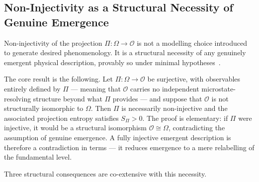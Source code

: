 \subsection{Non-Injectivity as a Structural Necessity of Genuine Emergence}
  \label{subsec:non-injectivity-not-ad-hoc}

  Non-injectivity of the projection $\Pi : \Omega \to \mathcal{O}$ is not a modelling
  choice introduced to generate desired phenomenology.
  It is a structural necessity of any genuinely emergent physical description, provably
  so under minimal hypotheses~\cite{Beau2026l}.

  The core result is the following.
  Let $\Pi : \Omega \to \mathcal{O}$ be surjective, with observables entirely defined
  by $\Pi$ --- meaning that $\mathcal{O}$ carries no independent microstate-resolving
  structure beyond what $\Pi$ provides --- and suppose that $\mathcal{O}$ is not
  structurally isomorphic to $\Omega$.
  Then $\Pi$ is necessarily non-injective and the associated projection entropy
  satisfies $S_\Pi > 0$.
  The proof is elementary: if $\Pi$ were injective, it would be a structural isomorphism
  $\mathcal{O} \cong \Omega$, contradicting the assumption of genuine emergence.
  A fully injective emergent description is therefore a contradiction in terms ---
  it reduces emergence to a mere relabelling of the fundamental level.

  Three structural consequences are co-extensive with this necessity.

